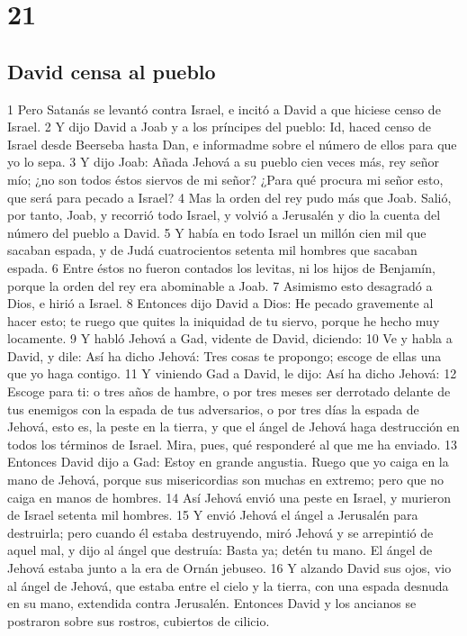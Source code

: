 \chapter{21}

\section*{David censa al pueblo}

1 Pero Satanás se levantó contra Israel, e incitó a David a que hiciese censo de Israel.
2 Y dijo David a Joab y a los príncipes del pueblo: Id, haced censo de Israel desde Beerseba hasta Dan, e informadme sobre el número de ellos para que yo lo sepa.
3 Y dijo Joab: Añada Jehová a su pueblo cien veces más, rey señor mío; ¿no son todos éstos siervos de mi señor? ¿Para qué procura mi señor esto, que será para pecado a Israel?
4 Mas la orden del rey pudo más que Joab. Salió, por tanto, Joab, y recorrió todo Israel, y volvió a Jerusalén y dio la cuenta del número del pueblo a David.
5 Y había en todo Israel un millón cien mil que sacaban espada, y de Judá cuatrocientos setenta mil hombres que sacaban espada.
6 Entre éstos no fueron contados los levitas, ni los hijos de Benjamín, porque la orden del rey era abominable a Joab.
7 Asimismo esto desagradó a Dios, e hirió a Israel.
8 Entonces dijo David a Dios: He pecado gravemente al hacer esto; te ruego que quites la iniquidad de tu siervo, porque he hecho muy locamente.
9 Y habló Jehová a Gad, vidente de David, diciendo:
10 Ve y habla a David, y dile: Así ha dicho Jehová: Tres cosas te propongo; escoge de ellas una que yo haga contigo.
11 Y viniendo Gad a David, le dijo: Así ha dicho Jehová:
12 Escoge para ti: o tres años de hambre, o por tres meses ser derrotado delante de tus enemigos con la espada de tus adversarios, o por tres días la espada de Jehová, esto es, la peste en la tierra, y que el ángel de Jehová haga destrucción en todos los términos de Israel. Mira, pues, qué responderé al que me ha enviado.
13 Entonces David dijo a Gad: Estoy en grande angustia. Ruego que yo caiga en la mano de Jehová, porque sus misericordias son muchas en extremo; pero que no caiga en manos de hombres.
14 Así Jehová envió una peste en Israel, y murieron de Israel setenta mil hombres.
15 Y envió Jehová el ángel a Jerusalén para destruirla; pero cuando él estaba destruyendo, miró Jehová y se arrepintió de aquel mal, y dijo al ángel que destruía: Basta ya; detén tu mano. El ángel de Jehová estaba junto a la era de Ornán jebuseo.
16 Y alzando David sus ojos, vio al ángel de Jehová, que estaba entre el cielo y la tierra, con una espada desnuda en su mano, extendida contra Jerusalén. Entonces David y los ancianos se postraron sobre sus rostros, cubiertos de cilicio.
